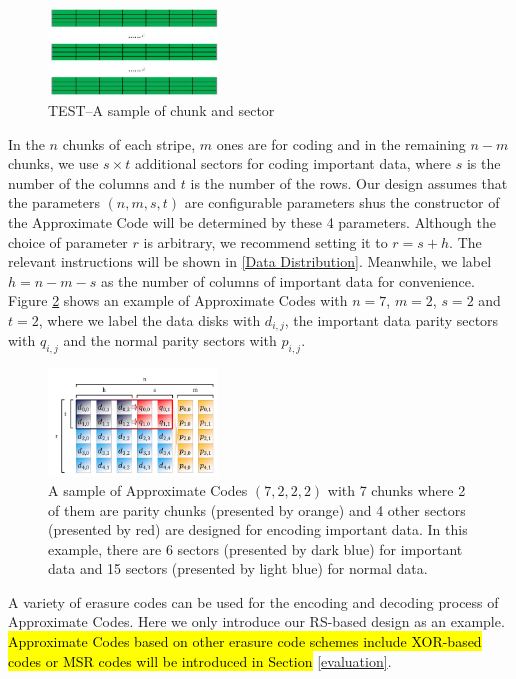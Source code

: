 \documentclass[conference]{IEEEtran}
\begin{document}
\begin{figure}[ht]
\centering
\includegraphics[width=0.4\textwidth]{photo/TEST-chunk-sector.JPG}
\caption{TEST--A sample of chunk and sector}
\label{TEST-chunk-sector}
\end{figure}

In the $n$ chunks of each stripe, $m$ ones are for coding and in the remaining $n-m$ chunks, we use $s \times t$ additional sectors for coding important data, where $s$ is the number of the columns and $t$ is the number of the rows.
Our design assumes that the parameters  $(n, m, s,t)$ are configurable parameters shus the constructor of the Approximate Code will be determined by these 4 parameters.
Although the choice of parameter $r$ is arbitrary, we recommend setting it to $r=s+h$.
The relevant instructions will be shown in \ref{Data Distribution}.
Meanwhile, we label $h=n-m-s$ as the number of columns of important data for convenience.
Figure \ref{apcode-7222-v4} shows an example of Approximate Codes with $n = 7$, $m = 2$, $s=2$ and $t = 2$, where we label the data disks with $d_{i,j}$, the important data parity sectors with $q_{i,j}$ and the normal parity sectors with $p_{i,j}$.

\begin{figure}[ht]
\centering
\includegraphics[width=0.4\textwidth]{photo/apcode-7222-v4.PDF}
\caption{A sample of Approximate Codes $(7,2,2,2)$ with 7 chunks where 2 of them are parity chunks (presented by orange) and 4 other sectors (presented by red) are designed for encoding important data. In this example, there are 6 sectors (presented by dark blue) for important data and 15 sectors (presented by light blue) for normal data.}
\label{apcode-7222-v4}
\end{figure}

A variety of erasure codes can be used for the encoding and decoding process of Approximate Codes. Here we only introduce our RS-based design as an example.
\hl{Approximate Codes based on other erasure code schemes include XOR-based codes or MSR codes will be introduced in Section }\ref{evaluation}.
\end{document}
